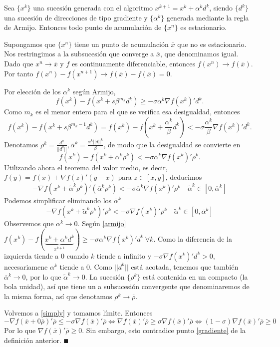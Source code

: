 \documentclass[MIOP.tex]{subfiles}
\begin{document}
\begin{teorema}
Sea $\{x^k\}$ una sucesión generada con el algoritmo $x^{k+1}=x^k+\alpha^kd^k$, siendo $\{d^k\}$ una sucesión de direcciones de tipo gradiente y $\{\alpha^k\}$ generada mediante la regla de Armijo. Entonces todo punto de acumulación de $\{x^n\}$ es estacionario.
\end{teorema}
\begin{dem}
Supongamos que $\{x^n\}$ tiene un punto de acumulación $\overline{x}$ que no es estacionario. Nos restringimos a la subsucesión que converge a $\overline{x}$, que denominamos igual. Dado que $x^n\to \overline{x}$ y $f$ es continuamente diferenciable, entonces $f(x^n)\to f(\overline{x})$. Por tanto $f(x^n)-f(x^{n+1})\to f(\overline{x})-f(\overline{x})=0$. 

Por elección de los $\alpha^k$ según Armijo, 
\begin{equation}\label{armijo}
f(x^k)-f(x^k+s\beta^{m_k}d^k)\geq -\sigma\alpha^k\nabla f(x^k)'d^k.
\end{equation}
 Como $m_k$ es el menor entero para el que se verifica esa desigualdad, entonces 
$$f(x^k)-f(x^k+{s\beta^{m_k-1}}d^k)=f(x^k)-f(x^k+\frac{\alpha^k}{\beta}d^k)<-\sigma\frac{\alpha^k}{\beta}\nabla f(x^k)'d^k.$$ 
Denotamos $\rho^k=\frac{d^k}{||d^k||},\overline{\alpha}^k=\frac{\alpha^k||d||^k}{\beta}$, de modo que la desigualdad se convierte en 
$$ f(x^k)-f(x^k+\overline{\alpha}^k\rho^k)< -\sigma\overline{\alpha}^k\nabla f(x^k)'\rho^k.$$
Utilizando ahora el teorema del valor medio, es decir, $f(y)=f(x)+\nabla f(z)'(y-x)$ para $z\in[x,y]$, deducimos
$$-\nabla f(x^k+\tilde{\alpha}^k\rho^k)'(\overline{\alpha}^k\rho^k) <-\sigma\overline{\alpha}^k\nabla f(x^k)'\rho^k\quad \tilde{\alpha}^k\in[0,\overline{\alpha}^k]$$
Podemos simplificar eliminando los $\overline{\alpha}^k$
\begin{equation}\label{simply}
-\nabla f(x^k+\tilde{\alpha}^k\rho^k)'\rho^k <-\sigma\nabla f(x^k)'\rho^k\quad \tilde{\alpha}^k\in[0,\overline{\alpha}^k]
\end{equation}
Observemos que $\alpha^k\to 0$. Según \ref{armijo}
$f(x^k)-f(\underbrace{x^k+\alpha^kd^k}_{x^{k+1}})\geq -\sigma\alpha^k\nabla f(x^k)'d^k\ \forall k$. Como la diferencia de la izquierda tiende a 0 cuando $k$ tiende a infinito y $-\sigma\nabla f(x^k)'d^k>0$, necesariamene $\alpha^k$ tiende a 0. Como $||d^k||$ está acotada, tenemos que también $\overline{\alpha}^k\to 0$, por lo que $\tilde{\alpha}^k\to 0$. La sucesión $\{\rho^k\}$ está contenida en un compacto (la bola unidad), así que tiene un a subsucesión convergente que denominaremos de la misma forma, así que denotamos $\rho^k\to\overline{\rho}$. 

Volvemos a \ref{simply} y tomamos límite. Entonces
$$-\nabla f(\overline{x}+0\overline{\rho})'\overline{\rho}\leq-\sigma\nabla f(\overline{x})'\overline{\rho} \Longleftrightarrow \nabla f(\overline{x})'\overline{\rho}\geq\sigma\nabla f(\overline{x})'\overline{\rho} \Longleftrightarrow (1-\sigma)\nabla f(\overline{x})'\overline{\rho}\geq 0$$
Por lo que $\nabla f(\overline{x})'\overline{\rho}\geq 0$. Sin embargo, esto contradice punto \ref{gradiente} de la definición anterior. 
$\QED$
\end{dem}
\end{document}
